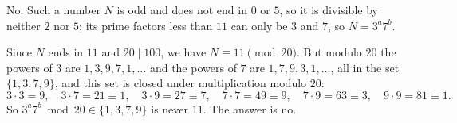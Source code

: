 No. Such a number $N$ is odd and does not end in $0$ or $5$, so it is divisible by neither $2$ nor $5$; its prime factors less than $11$ can only be $3$ and $7$, so $N=3^a7^b$.

Since $N$ ends in $11$ and $20\mid100$, we have $N\equiv11\pmod{20}$. But modulo $20$ the powers of $3$ are $1,3,9,7,1,\dots$ and the powers of $7$ are $1,7,9,3,1,\dots$, all in the set $\{1,3,7,9\}$, and this set is closed under multiplication modulo $20$:
\[3\cdot3=9,\quad3\cdot7=21\equiv1,\quad3\cdot9=27\equiv7,\quad7\cdot7=49\equiv9,\quad7\cdot9=63\equiv3,\quad9\cdot9=81\equiv1.\]
So $3^a7^b\bmod20\in\{1,3,7,9\}$ is never $11$. The answer is $\boxed{\text{no}}$.
